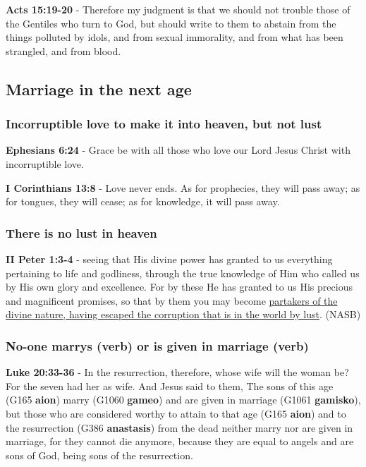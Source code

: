 \documentclass[11pt]{article}
\begin{document}
\textbf{Acts 15:19-20} - Therefore my judgment is that we should not trouble those of the Gentiles who turn to God, but should write to them to abstain from the things polluted by idols, and from sexual immorality, and from what has been strangled, and from blood.

\subsection{Marriage in the next age}
\label{sec:org16fb5af}
\subsubsection{Incorruptible love to make it into heaven, but not lust}
\label{sec:orgbc21db9}
\textbf{Ephesians 6:24} - Grace be with all those who love our Lord Jesus Christ with incorruptible love.

\textbf{I Corinthians 13:8} - Love never ends. As for prophecies, they will pass away; as for tongues, they will cease; as for knowledge, it will pass away.

\subsubsection{There is no lust in heaven}
\label{sec:org039a363}

\textbf{II Peter 1:3-4} - seeing that His divine power has granted to us everything pertaining to life and godliness, through the true knowledge of Him who called us by His own glory and excellence. For by these He has granted to us His precious and magnificent promises, so that by them you may become \uline{partakers of the divine nature, having escaped the corruption that is in the world by lust}. (NASB)

\subsubsection{No-one \textbf{marrys} (verb) or is \textbf{given in marriage} (verb)}
\label{sec:org57d49fd}
\textbf{Luke 20:33-36} - In the resurrection, therefore, whose wife will the woman be? For the seven had her as wife. And Jesus said to them, The sons of this age (G165 \textbf{aion}) marry (G1060 \textbf{gameo}) and are given in marriage (G1061 \textbf{gamisko}), but those who are considered worthy to attain to that age (G165 \textbf{aion}) and to the resurrection (G386 \textbf{anastasis}) from the dead neither marry nor are given in marriage, for they cannot die anymore, because they are equal to angels and are sons of God, being sons of the resurrection.
\end{document}
